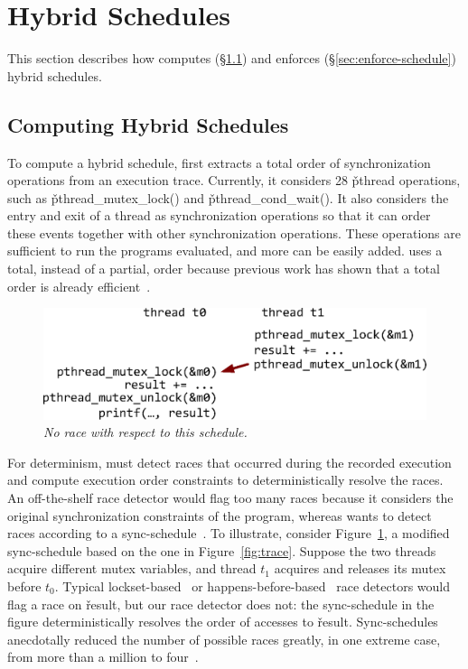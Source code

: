 \section{Hybrid Schedules} \label{sec:schedule}

This section describes how \peregrine computes (\S\ref{sec:compute-schedule})
and enforces (\S\ref{sec:enforce-schedule}) hybrid schedules.

\subsection{Computing Hybrid Schedules} \label{sec:compute-schedule}

To compute a hybrid schedule, \peregrine first extracts a total order of
synchronization operations from an execution trace.  Currently, it
considers 28 \v{pthread} operations, such as \v{pthread\_mutex\_lock()}
and \v{pthread\_cond\_wait()}.  It also considers
the entry and exit of a thread as synchronization operations so that it can
order these events together with other synchronization operations.  These
operations are sufficient to run the programs evaluated, and more can be
easily added.  \peregrine uses a total, instead of a partial, order because
previous work has shown that a total order is already
efficient~\cite{cui:tern:osdi10,kendo:asplos09}.

\begin{figure}[t]
\centering
\includegraphics[width=.9\columnwidth]{peregrine/figures/concurrent-intervals.eps}
\caption{{\em No \peregrine race with respect to this
    schedule.}} \label{fig:concurrent-intervals}
\end{figure}

For determinism, \peregrine must detect races that occurred during the recorded
execution and compute execution order constraints to deterministically
resolve the races.  An off-the-shelf race detector would flag too many
races because it considers the original synchronization
constraints of the program, whereas \peregrine wants to detect races according
to a sync-schedule~\cite{pres:sosp09,recplay:tocs}.  To illustrate,
consider Figure~\ref{fig:concurrent-intervals}, a modified sync-schedule
based on the one in Figure~\ref{fig:trace}.  Suppose the two threads
acquire different mutex variables, and thread $t_1$ acquires and releases
its mutex before $t_0$.  Typical lockset-based~\cite{savage:eraser}
or happens-before-based~\cite{lamportclock} race detectors would flag a
race on \v{result}, but our race detector does not: the sync-schedule
in the figure deterministically resolves the order of accesses to \v{result}.  
Sync-schedules anecdotally reduced the number of
possible races greatly, in one extreme case, from more than a million to
four~\cite{pres:sosp09}.


